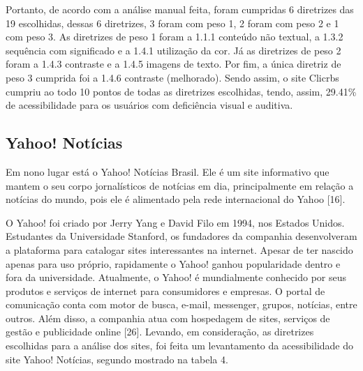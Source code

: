 \documentclass[a4paper]{article}
\begin{document}
\begin{titlepage}
Portanto, de acordo com a análise manual feita, foram cumpridas 6 diretrizes das 19 escolhidas, dessas 6 diretrizes, 3 foram com peso 1, 2 foram com peso 2 e 1 com peso 3. As diretrizes de peso 1 foram a 1.1.1 conteúdo não textual, a 1.3.2 sequência com significado e a 1.4.1 utilização da cor. Já as diretrizes de peso 2 foram a 1.4.3 contraste e a 1.4.5 imagens de texto. Por fim, a única diretriz de peso 3 cumprida foi a 1.4.6 contraste (melhorado). Sendo assim, o site Clicrbs cumpriu ao todo 10 pontos de todas as diretrizes escolhidas, tendo, assim, 29.41\% de acessibilidade para os usuários com deficiência visual e auditiva.

\subsection{Yahoo! Notícias}

Em nono lugar está o Yahoo! Notícias Brasil. Ele é um site informativo que mantem o seu corpo jornalísticos de notícias em dia, principalmente em relação a notícias do mundo, pois ele é alimentado pela rede internacional do Yahoo [16].

O Yahoo! foi criado por Jerry Yang e David Filo em 1994, nos Estados Unidos. Estudantes da Universidade Stanford, os fundadores da companhia desenvolveram a plataforma para catalogar sites interessantes na internet. Apesar de ter nascido apenas para uso próprio, rapidamente o Yahoo! ganhou popularidade dentro e fora da universidade. Atualmente, o Yahoo! é mundialmente conhecido por seus produtos e serviços de internet para consumidores e empresas. O portal de comunicação conta com motor de busca, e-mail, messenger, grupos, notícias, entre outros. Além disso, a companhia atua com hospedagem de sites, serviços de gestão e publicidade online [26]. Levando, em consideração, as diretrizes escolhidas para a análise dos sites, foi feita um levantamento da acessibilidade do site Yahoo! Notícias, segundo mostrado na tabela 4.\\


\end{titlepage}
\end{document}
